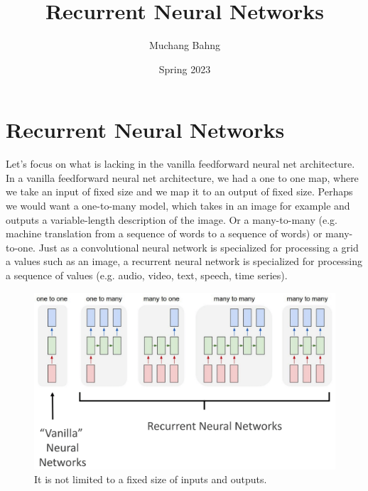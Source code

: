 \documentclass{article}
\begin{document}

\title{Recurrent Neural Networks}
\author{Muchang Bahng}
\date{Spring 2023}

\maketitle
\tableofcontents
\pagebreak 




\section{Recurrent Neural Networks}

  Let's focus on what is lacking in the vanilla feedforward neural net architecture. In a vanilla feedforward neural net architecture, we had a one to one map, where we take an input of fixed size and we map it to an output of fixed size. Perhaps we would want a one-to-many model, which takes in an image for example and outputs a variable-length description of the image. Or a many-to-many (e.g. machine translation from a sequence of words to a sequence of words) or many-to-one. Just as a convolutional neural network is specialized for processing a grid a values such as an image, a recurrent neural network is specialized for processing a sequence of values (e.g. audio, video, text, speech, time series). 

  \begin{figure}[H]
    \centering 
    \includegraphics[scale=0.25]{img/NNs_vs_RNN.png}
    \caption{It is not limited to a fixed size of inputs and outputs.} 
    \label{fig:rnns}
  \end{figure}
\end{document}
